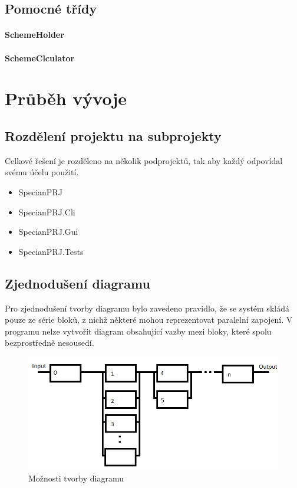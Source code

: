 \documentclass[FM,RP]{tulthesis}
\begin{document}
    \section{Pomocné třídy}
        \subsubsection{SchemeHolder}
            
        \subsubsection{SchemeClculator}

\chapter{Průběh vývoje}
    \section{Rozdělení projektu na subprojekty}
        Celkové řešení je rozděleno na několik podprojektů, tak aby každý odpovídal svému účelu použití.
        \begin{itemize} 
        \item SpecianPRJ
        \item SpecianPRJ.Cli
        \item SpecianPRJ.Gui
        \item SpecianPRJ.Tests
        \end{itemize}
    \section{Zjednodušení diagramu}
        Pro zjednodušení tvorby diagramu bylo zavedeno pravidlo, že se systém skládá pouze ze série bloků, z nichž některé mohou reprezentovat paralelní zapojení.
        V programu nelze vytvořit diagram obsahující vazby mezi bloky, které spolu bezprostředně nesousedí.
        \begin{figure}[h]
            \centering
            \includegraphics[scale=0.75]{pic/moznosti.png}
            \caption{Možnosti tvorby diagramu} \label{Obrázek č. 2.1}
    \end{figure}
\end{document}
